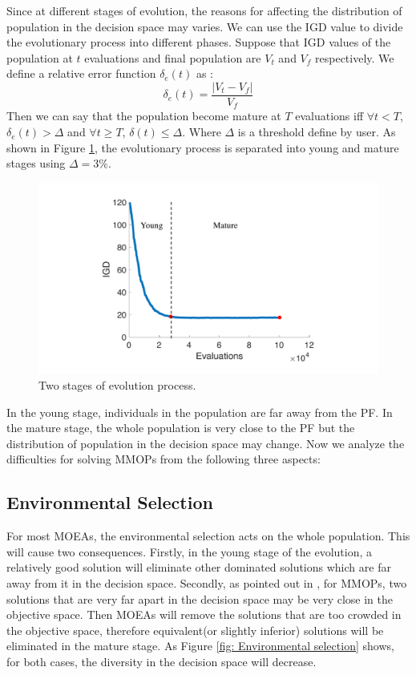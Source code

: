 \documentclass[conference]{IEEEtran}
\begin{document}
Since at different stages of evolution, the reasons for affecting the distribution of population in the decision space may varies. We can use the IGD\cite{IGD} value to divide the evolutionary process into different phases. Suppose that IGD values of the population at $t$ evaluations and final population are $V_t$ and $V_f$ respectively. We define a relative error function $\delta_e(t)$ as :
$$\delta_e(t)=\frac{|V_t-V_f|}{V_f}$$
Then we can say that the population become mature at $T$ evaluations iff $\forall t<T$, $\delta_e(t)>\Delta$ and $\forall t \ge T$, $\delta(t) \leq \Delta$. Where $\Delta$ is a threshold define by user. As shown in Figure \ref{fig: Two stages}, the evolutionary process is separated into young and mature stages using $\Delta=3\%$.
\begin{figure}[htbp]
    \centering
    \includegraphics[width=.35\textwidth]{Section3/Stages}
    \caption{Two stages of evolution process.}
    \label{fig: Two stages}
\end{figure}

In the young stage, individuals in the population are far away from the PF. In the mature stage, the whole population is very close to the PF but the distribution of population in the decision space may change. Now we analyze the difficulties for solving MMOPs from the following three aspects:

\subsection{Environmental Selection}
\label{Impact of environmental selection}
For most MOEAs, the environmental selection acts on the whole population. This will cause two consequences.
Firstly, in the young stage of the evolution, a relatively good solution will eliminate other dominated solutions which are far away from it in the decision space. Secondly, as pointed out in \cite{Liang2016}, for MMOPs, two solutions that are very far apart in the decision space may be very close in the objective space. Then MOEAs will remove the solutions that are too crowded in the objective space, therefore equivalent(or slightly inferior) solutions will be eliminated in the mature stage. As Figure \ref{fig: Environmental selection} shows, for both cases, the diversity in the decision space will decrease. 
\end{document}
